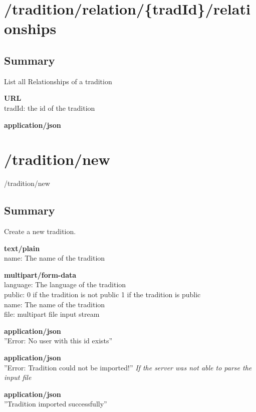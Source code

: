 \documentclass[11pt,fleqn,openany]{book} %
\begin{document}
\section{/tradition/relation/\{tradId\}/relationships}
\begin{get}
/tradition/relation/\{tradId\/relationships}
\end{get}

\subsection*{Summary}
List all Relationships of a tradition
\begin{parameter}\textbf{URL}\\
tradId: the id of the tradition \\
\end{parameter}
\begin{return}[OK]
\textbf{application/json}\\
\end{return}

\section{/tradition/new}
\begin{post}
/tradition/new
\end{post}

\subsection*{Summary}
Create a new tradition.
\begin{parameter}
\textbf{text/plain}\\
name: The name of the tradition
\end{parameter}
\begin{parameter}
\textbf{multipart/form-data}\\
language: The language of the tradition\\
public: 0 if the tradition is not public 1 if the tradition is public\\
name: The name of the tradition\\
file: multipart file input stream
\end{parameter}
\begin{return}[CONFLICT]
\textbf{application/json}\\
''Error: No user with this id exists''
\end{return}
\begin{return}
\textbf{application/json}\\
''Error: Tradition could not be imported!''
\textit{If the server was not able to parse the input file}
\end{return}
\begin{return}[OK]
\textbf{application/json}\\
''Tradition imported successfully''
\end{return}
\end{document}
